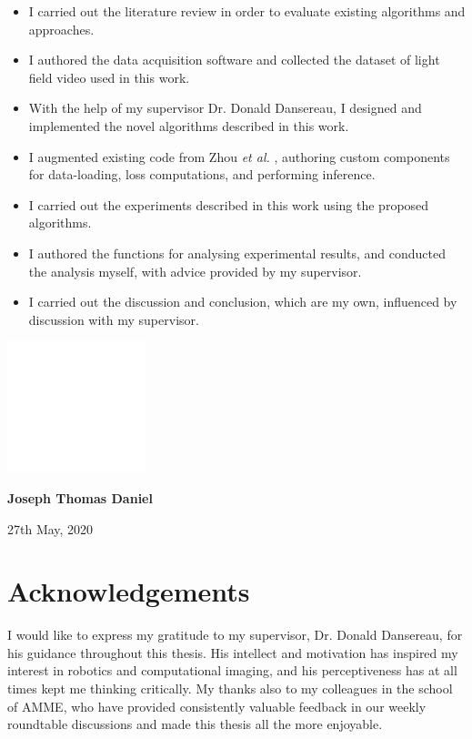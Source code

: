 \documentclass[openany]{book}
\begin{document}
\begin{itemize}
  \item I carried out the literature review in order to evaluate existing algorithms and approaches.
  \item I authored the data acquisition software and collected the dataset of light field video used in this work. 
  \item With the help of my supervisor Dr. Donald Dansereau, I designed and implemented the novel algorithms described in this work.
  \item I augmented existing code from Zhou \textit{et al.} \cite{zhou2017unsupervised}, authoring custom components for data-loading, loss computations, and performing inference.
  \item I carried out the experiments described in this work using the proposed algorithms.
  \item I authored the functions for analysing experimental results, and conducted the analysis myself, with advice provided by my supervisor. 
  \item I carried out the discussion and conclusion, which are my own, influenced by discussion with my supervisor.
\end{itemize}

\includegraphics[height=1.5in]{images/blank.png}

\textbf{Joseph Thomas Daniel} 

27th May, 2020


\chapter*{Acknowledgements}
I would like to express my gratitude to my supervisor, Dr. Donald Dansereau, for his guidance throughout this thesis. His intellect and motivation has inspired my interest in robotics and computational imaging, and his perceptiveness has at all times kept me thinking critically. My thanks also to my colleagues in the school of AMME, who have provided consistently valuable feedback in our weekly roundtable discussions and made this thesis all the more enjoyable.
\end{document}
